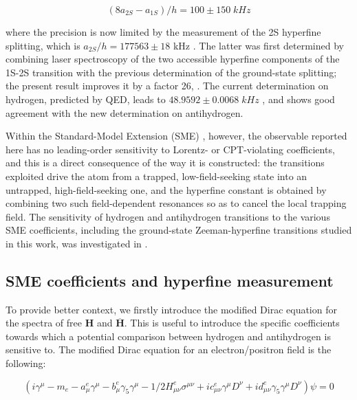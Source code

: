 \begin{equation*}
(8 a_{2S} - a_{1S}) / h = 100 \pm 150 \; kHz
\end{equation*}

where the precision is now limited by the measurement of the 2S hyperfine splitting, which is $a_{2S}/h = 177563 \pm 18$ kHz \cite{ALPHA:2026lbu}. The latter was first determined by combining laser spectroscopy of the two accessible hyperfine components of the 1S-2S transition with the previous \ALPHA determination of the ground-state splitting; the present result improves it by a factor 26, \cite{Baker:2025hfs,ALPHA:2026lbu}. The current determination on hydrogen, predicted by QED, leads to $48.9592 \pm 0.0068 \; kHz$ \cite{PhysRevLett.130.203001}, and shows good agreement with the new determination on antihydrogen.

Within the Standard-Model Extension (SME) \cite{ColladayKostelecky1997,ColladayKostelecky1998}, however, the observable reported here has no leading-order sensitivity to Lorentz- or CPT-violating coefficients, and this is a direct consequence of the way it is constructed: the transitions exploited drive the atom from a trapped, low-field-seeking state into an untrapped, high-field-seeking one, and the hyperfine constant is obtained by combining two such field-dependent resonances so as to cancel the local trapping field. The sensitivity of hydrogen and antihydrogen transitions to the various SME coefficients, including the ground-state Zeeman-hyperfine transitions studied in this work, was investigated in \cite{Bluhm_1999,Kostelecky:2015nma}.

\subsection{SME coefficients and hyperfine measurement}

To provide better context, we firstly introduce the modified Dirac equation for the spectra of free $\bm{H}$ and $\bm{\overline{H}}$. This is useful to introduce the specific coefficients towards which a potential comparison between hydrogen and antihydrogen is sensitive to. The modified Dirac equation for an electron/positron field is the following:

\begin{equation}
(i \gamma^{\mu} - m_{e} - a^{e}_{\mu} \gamma^{\mu} - b^{e}_{\mu} \gamma_{5}\gamma^{\mu} - 1/2 H^{e}_{\mu \nu} \sigma^{\mu \nu} + i c^{e}_{\mu \nu} \gamma^{\mu} D^{\nu} + i d^{e}_{\mu \nu} \gamma_{5}\gamma^{\mu} D^{\nu})\psi = 0
\end{equation}

